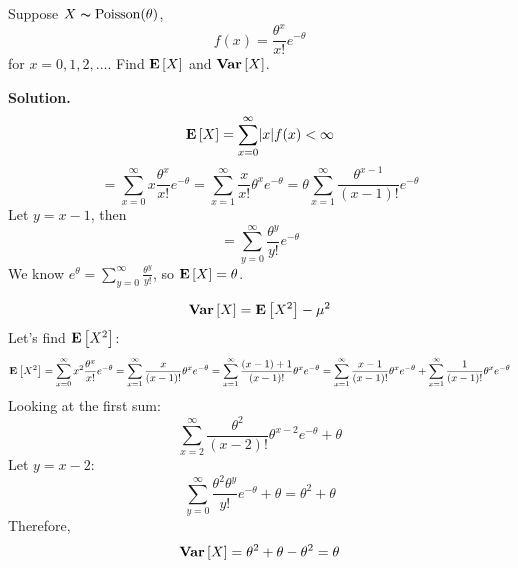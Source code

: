 \begin{Example}{}{}
    Suppose $ X \thicksim \operatorname{Poisson}(\theta) $,
    \[ f(x)=\frac{\theta^x}{x!} e^{-\theta} \]
    for $ x=0,1,2,\ldots $. Find $ \bm{\mathrm{E}}\left[X\right] $ and $ \bm{\mathrm{Var}}\left[X\right] $.

    \textbf{Solution.}
    \[ \bm{\mathrm{E}}\left[X\right]=\sum\limits_{x=0}^{\infty} \lvert x\rvert f(x)<\infty \]
    \[ =\sum\limits_{x=0}^{\infty} x \frac{\theta^x}{x!} e^{-\theta}
        =\sum\limits_{x=1}^{\infty} \frac{x}{x!} \theta^x e^{-\theta}
        =\theta \sum\limits_{x=1}^{\infty} \frac{\theta^{x-1}}{(x-1)!}
        e^{-\theta}  \]
    Let $ y=x-1 $, then
    \[ = \sum\limits_{y=0}^{\infty} \frac{\theta^y}{y!} e^{-\theta} \]
    We know $ e^{\theta}=\sum\limits_{y=0}^{\infty} \frac{\theta^y}{y!} $,
    so $ \bm{\mathrm{E}}\left[X\right]= \theta $.

    \[ \bm{\mathrm{Var}}\left[X\right]=\bm{\mathrm{E}}\left[X^2\right]-\mu^2 \]
    Let's find $ \bm{\mathrm{E}}\left[X^2\right] $:
    \[ \bm{\mathrm{E}}\left[X^2\right]=\sum\limits_{x=0}^{\infty} x^2 \frac{\theta^x}{x!} e^{-\theta}
        =\sum\limits_{x=1}^{\infty} \frac{x}{(x-1)!}\theta^xe^{-\theta}
        =\sum\limits_{x=1}^{\infty} \frac{(x-1)+1}{(x-1)!} \theta^x e^{-\theta}
        =\sum\limits_{x=1}^{\infty} \frac{x-1}{(x-1)!}\theta^x e^{-\theta}+
        \sum\limits_{x=1}^{\infty} \frac{1}{(x-1)!}\theta^x e^{-\theta}    \]
    Looking at the first sum:
    \[ \sum\limits_{x=2}^{\infty} \frac{\theta^2}{(x-2)!} \theta^{x-2}e^{-\theta}+\theta \]
    Let $ y=x-2 $:
    \[ \sum\limits_{y=0}^{\infty}\frac{\theta^2\theta^y}{y!}e^{-\theta}+\theta=
        \theta^2+\theta   \]
    Therefore,
    \[ \bm{\mathrm{Var}}\left[X\right]=\theta^2+\theta-\theta^2=\theta \]
\end{Example}
